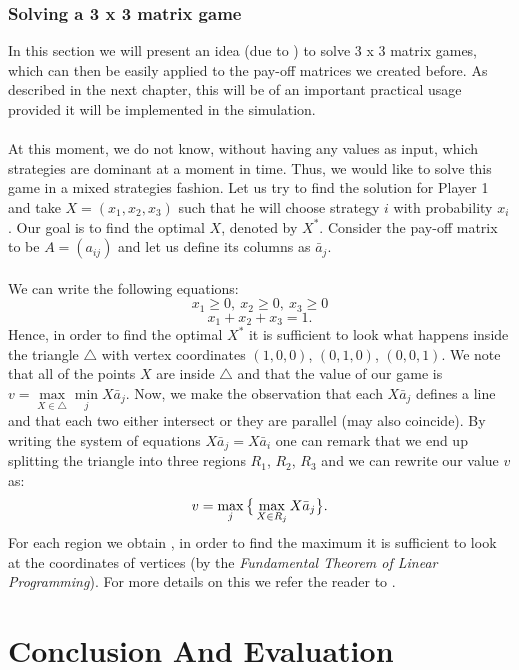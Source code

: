 \documentclass[10pt, a4paper]{report}
\begin{document}
\subsection{Solving a 3 x 3 matrix game}
In this section we will present an idea (due to \cite{TheoryOfGames}) to solve 3 x 3 matrix games, which can then be easily applied to the pay-off matrices we created before. As described in the next chapter, this will be of an important practical usage provided it will be implemented in the simulation.\\\\
At this moment, we do not know, without having any values as input, which strategies are dominant at a moment in time. Thus, we would like to solve this game in a mixed strategies fashion. Let us try to find the solution for Player 1 and take $X=(x_1,x_2,x_3)$ such that he will choose strategy $i$ with probability $x_i$. Our goal is to find the optimal $X$, denoted by $X^*$. Consider the pay-off matrix to be $A = (a_{ij})$ and let us define its columns as $\bar{a}_j$.\\\\
We can write the following equations:
$$x_1\ge 0,\ x_2\ge 0,\ x_3\ge 0$$
$$x_1+x_2+x_3=1.$$
Hence, in order to find the optimal $X^*$ it is sufficient to look what happens inside the triangle $\triangle$ with vertex coordinates $(1,0,0)$, $(0,1,0)$, $(0,0,1)$. We note that all of the points $X$ are inside $\triangle$ and that the value of our game is $v = \max\limits_{X\in \triangle}\min\limits_{j} X\bar{a}_j$. Now, we make the observation that each $X\bar{a}_j$ defines a line and that each two either intersect or they are parallel (may also coincide). By writing the system of equations $X\bar{a}_j = X\bar{a}_i$ one can remark that we end up splitting the triangle into three regions $R_1$, $R_2$, $R_3$ and we can rewrite our value $v$ as: $$v = \max\limits_{j}\big{\{}\max\limits_{X\in R_j} X\bar{a}_j\big{\}}.$$
For each region we obtain , in order to find the maximum it is sufficient to look at the coordinates of vertices (by the \textit{Fundamental Theorem of Linear Programming}). For more details on this we refer the reader to \cite{TheoryOfGames}.

\chapter{Conclusion And Evaluation}\label{ch:concl}

\end{document}
